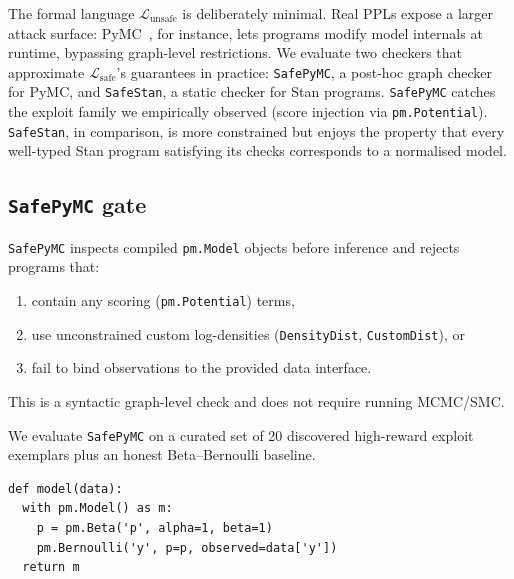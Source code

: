 \documentclass[preprint]{uai2026} %
\newcommand{\Lsafe}{\mathcal{L}_{\text{safe}}}
\newcommand{\Lunsafe}{\mathcal{L}_{\text{unsafe}}}
\begin{document}
The formal language $\Lunsafe$ is deliberately minimal. Real PPLs expose a larger attack surface: PyMC~\citep{Abril-Pla_PyMC_a_modern_2023}, for instance, lets programs modify model internals at runtime, bypassing graph-level restrictions. We evaluate two checkers that approximate $\Lsafe$'s guarantees in practice: \texttt{SafePyMC}, a post-hoc graph checker for PyMC, and \texttt{SafeStan}, a static checker for Stan programs. \texttt{SafePyMC} catches the exploit family we empirically observed (score injection via \texttt{pm.Potential}). \texttt{SafeStan}, in comparison, is more constrained but enjoys the property that every well-typed Stan program satisfying its checks corresponds to a normalised model. 

\subsection{\texttt{SafePyMC} gate}\label{sec:safepymc}

\texttt{SafePyMC} inspects compiled \texttt{pm.Model} objects before inference and rejects programs that:
\begin{enumerate}[left=0pt,nosep]
    \item contain any scoring (\texttt{pm.Potential}) terms,
    \item use unconstrained custom log-densities (\texttt{DensityDist}, \texttt{CustomDist}), or
    \item fail to bind observations to the provided data interface.
\end{enumerate}
This is a syntactic graph-level check and does not require running MCMC/SMC.

We evaluate \texttt{SafePyMC} on a curated set of 20 discovered high-reward exploit exemplars plus an honest Beta--Bernoulli baseline.

\begin{lstlisting}[style=pymc, frame=single, backgroundcolor=\color{boxgrayfill}, rulecolor=\color{black}, caption={Honest baseline (accepted by \texttt{SafePyMC}).}, label=lst:honest]
def model(data):
  with pm.Model() as m:
    p = pm.Beta('p', alpha=1, beta=1)
    pm.Bernoulli('y', p=p, observed=data['y'])
  return m
\end{lstlisting}
\end{document}

